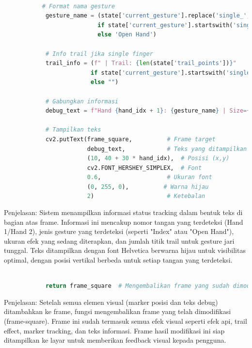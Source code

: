\documentclass[11pt,a4paper]{article}
\begin{document}
    \begin{lstlisting}[language=Python, caption=Teks Informasi Debug]
    
           # Format nama gesture
            gesture_name = (state['current_gesture'].replace('single_', '').title() 
                           if state['current_gesture'].startswith('single_') 
                           else 'Open Hand')
            
            # Info trail jika single finger
            trail_info = (f" | Trail: {len(state['trail_points'])}" 
                         if state['current_gesture'].startswith('single_') 
                         else "")
            
            # Gabungkan informasi
            debug_text = f"Hand {hand_idx + 1}: {gesture_name} | Size={effect_size}{trail_info}"
            
            # Tampilkan teks
            cv2.putText(frame_square,          # Frame target
                        debug_text,            # Teks yang ditampilkan
                        (10, 40 + 30 * hand_idx),  # Posisi (x,y)
                        cv2.FONT_HERSHEY_SIMPLEX,  # Font
                        0.6,                   # Ukuran font
                        (0, 255, 0),          # Warna hijau
                        2)                     # Ketebalan
    \end{lstlisting}
    Penjelasan: Sistem menampilkan informasi status tracking dalam bentuk teks di bagian atas frame. Informasi ini mencakup nomor tangan yang terdeteksi (Hand 1/Hand 2), jenis gesture yang terdeteksi (seperti "Index" atau "Open Hand"), ukuran efek yang sedang diterapkan, dan jumlah titik trail untuk gesture jari tunggal. Teks ditampilkan dengan font Helvetica berwarna hijau untuk visibilitas optimal, dengan posisi vertikal berbeda untuk setiap tangan yang terdeteksi.

    \begin{lstlisting}[language=Python, caption=Return Hasil]
    
            return frame_square  # Mengembalikan frame yang sudah dimodifikasi
    \end{lstlisting}
    Penjelasan: Setelah semua elemen visual (marker posisi dan teks debug) ditambahkan ke frame, fungsi mengembalikan frame yang telah dimodifikasi (frame-square). Frame ini sudah termasuk semua efek visual seperti efek api, trail effect, marker tracking, dan teks informasi. Frame hasil modifikasi ini siap ditampilkan ke layar untuk memberikan feedback visual kepada pengguna.
\end{document}
